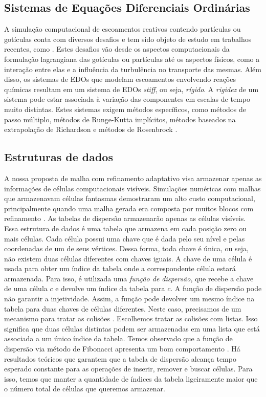 \documentclass[12pt, brazil]{article}
\begin{document}
\subsection{Sistemas de Equações Diferenciais Ordinárias}

A simulação computacional de escoamentos reativos contendo partículas ou gotículas conta com diversos desafios e tem sido objeto de estudo em trabalhos recentes, como \cite{APT09,SAN13,SAN11,MIN15,RIB09}. Estes desafios vão desde os aspectos computacionais da formulação lagrangiana das gotículas ou partículas até os aspectos físicos, como a interação entre elas e a influência da turbulência no transporte das mesmas. Além disso, os sistemas de EDOs que modelam escoamentos envolvendo reações químicas resultam em um sistema de EDOs {\it stiff}, ou seja, {\em rígido}. A {\em rigidez} de um sistema pode estar associada à variação das componentes em escalas de tempo muito distintas. Estes sistemas exigem métodos específicos, como métodos de passo múltiplo, métodos de Runge-Kutta implícitos, métodos baseados na extrapolação de Richardson e métodos de Rosenbrock \cite{BUT03,HUA19}. 

\subsection{Estruturas de dados}

A nossa proposta de malha com refinamento adaptativo visa armazenar apenas as informações de células computacionais visíveis. Simulações numéricas com malhas que armazenavam células fantasmas demostraram um alto custo computacional, principalmente quando uma malha gerada era composta por muitos blocos com refinamento \cite{CAL12}.  As tabelas de dispersão armazenarão apenas as células visíveis. Essa estrutura de dados  é uma tabela que armazena em cada posição zero ou mais células. Cada célula possui uma chave que é dada pelo seu nível e pelas coordenadas de um de seus vértices. Dessa forma, toda chave é única, ou seja, não existem duas células diferentes com chaves iguais. A chave de uma célula é usada para obter um índice da tabela onde a correspondente célula estará armazenada. Para isso, é utilizada uma {\em função de dispersão}, que recebe a chave de uma célula $c$ e devolve um índice da tabela para $c$. A função de dispersão pode não garantir a injetividade. Assim,  a função pode devolver um mesmo índice na tabela para duas chaves de células diferentes. Neste caso, precisamos de um mecanismo para tratar as colisões \cite{GRI99,MUL12,SZW12}. Escolhemos tratar as colisões com listas. Isso significa que duas células distintas podem ser armazenadas em uma lista que está associada a um único índice da tabela. Temos observado que a função de dispersão via método de Fibonacci apresenta um bom comportamento \cite{KNU97}. Há resultados teóricos que garantem que a tabela de dispersão alcança tempo esperado constante para as operações de inserir, remover e buscar células. Para isso, temos que manter a quantidade de índices da tabela ligeiramente maior que o número total de células que queremos armazenar.
       
\end{document}
